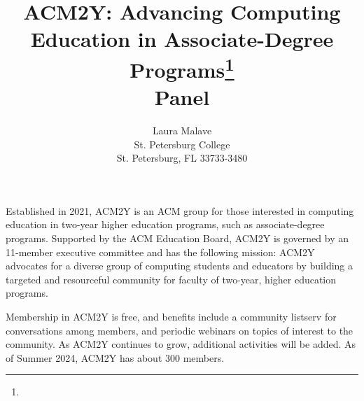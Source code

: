 \documentclass{article}
\title{ACM2Y: Advancing Computing Education in Associate-Degree Programs\footnote{\protect}
\\
\vspace{0.2in}
\large{
Panel
}}
\author{
Laura Malave\\
St. Petersburg College\\
St. Petersburg, FL 33733-3480\\
\email{Malave.Laura@spcollege.edu}
}
\begin{document}
\maketitle

Established in 2021, ACM2Y is an ACM group for those interested in
computing education in two-year higher education programs, such as
associate-degree programs. Supported by the ACM Education Board, ACM2Y
is governed by an 11-member executive committee and has the following
mission: ACM2Y advocates for a diverse group of computing students and
educators by building a targeted and resourceful community for faculty
of two-year, higher education programs.

Membership in ACM2Y is free,
and benefits include a community listserv for conversations among
members, and periodic webinars on topics of interest to the
community. As ACM2Y continues to grow, additional activities will be
added. As of Summer 2024, ACM2Y has about 300 members.
\end{document}
